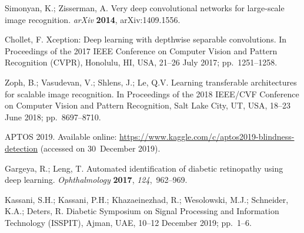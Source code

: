 \documentclass[electronics,article,accept ,moreauthors,pdftex]{mdpi}
\begin{document}
\begin{thebibliography}{999}
Simonyan, K.; Zisserman, A.
Very deep convolutional networks for large-scale image recognition.
{\em arXiv} {\bf 2014}, arXiv:1409.1556.

Chollet, F.
Xception: Deep learning with depthwise separable convolutions.
In Proceedings of the 2017 IEEE Conference on Computer Vision and Pattern Recognition (CVPR), Honolulu, HI, USA, 21--26 July 2017; pp.~1251--1258.

Zoph, B.; Vasudevan, V.; Shlens, J.; Le, Q.V.
Learning transferable architectures for scalable image recognition.
In Proceedings of the 2018 IEEE/CVF Conference on Computer Vision and Pattern Recognition, Salt Lake City, UT, USA, 18--23 June 2018; pp.~8697--8710.

APTOS 2019.
Available online: \url{https://www.kaggle.com/c/aptos2019-blindness-detection}
(accessed on 30~December 2019).

Gargeya, R.; Leng, T.
Automated identification of diabetic retinopathy using deep learning.
{\em Ophthalmology} {\bf 2017}, {\em 124},~962--969.

Kassani, S.H.; Kassani, P.H.; Khazaeinezhad, R.; Wesolowski, M.J.; Schneider,
 K.A.; Deters, R.
Diabetic  Symposium on Signal Processing and Information Technology (ISSPIT), Ajman, UAE, 10--12 December 2019; pp.~1--6.

\end{thebibliography}
\end{document}

